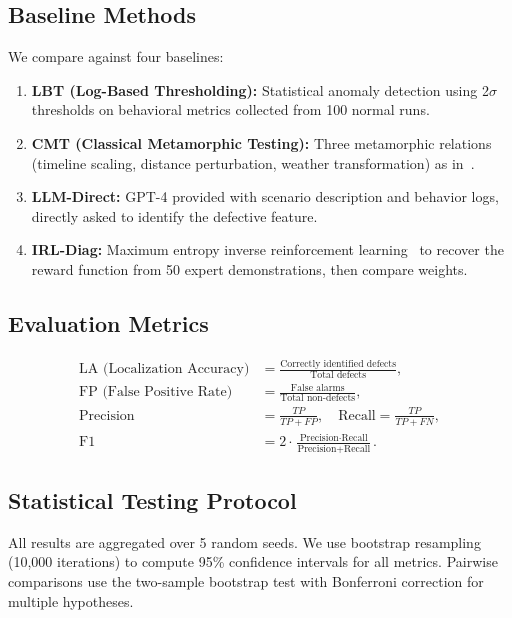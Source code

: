 \documentclass[journal]{IEEEtran}
\theoremstyle{plain}
\theoremstyle{definition}
\theoremstyle{remark}
\begin{document}
\subsection{Baseline Methods}

We compare against four baselines:
\begin{enumerate}[nosep]
    \item \textbf{LBT (Log-Based Thresholding):} Statistical anomaly detection using 2$\sigma$ thresholds on behavioral metrics collected from 100 normal runs.
    \item \textbf{CMT (Classical Metamorphic Testing):} Three metamorphic relations (timeline scaling, distance perturbation, weather transformation) as in~\cite{deng2023rmt}.
    \item \textbf{LLM-Direct:} GPT-4 provided with scenario description and behavior logs, directly asked to identify the defective feature.
    \item \textbf{IRL-Diag:} Maximum entropy inverse reinforcement learning~\cite{ng2000policy} to recover the reward function from 50 expert demonstrations, then compare weights.
\end{enumerate}

\subsection{Evaluation Metrics}

\begin{align}
\text{LA (Localization Accuracy)} &= \frac{\text{Correctly identified defects}}{\text{Total defects}}, \label{eq:la} \\
\text{FP (False Positive Rate)} &= \frac{\text{False alarms}}{\text{Total non-defects}}, \label{eq:fp} \\
\text{Precision} &= \frac{TP}{TP+FP}, \quad \text{Recall} = \frac{TP}{TP+FN}, \label{eq:pr} \\
\text{F1} &= 2\cdot\frac{\text{Precision}\cdot\text{Recall}}{\text{Precision}+\text{Recall}}. \label{eq:f1}
\end{align}

\subsection{Statistical Testing Protocol}

All results are aggregated over 5 random seeds. We use bootstrap resampling (10,000 iterations) to compute 95\% confidence intervals for all metrics. Pairwise comparisons use the two-sample bootstrap test with Bonferroni correction for multiple hypotheses.
\end{document}
